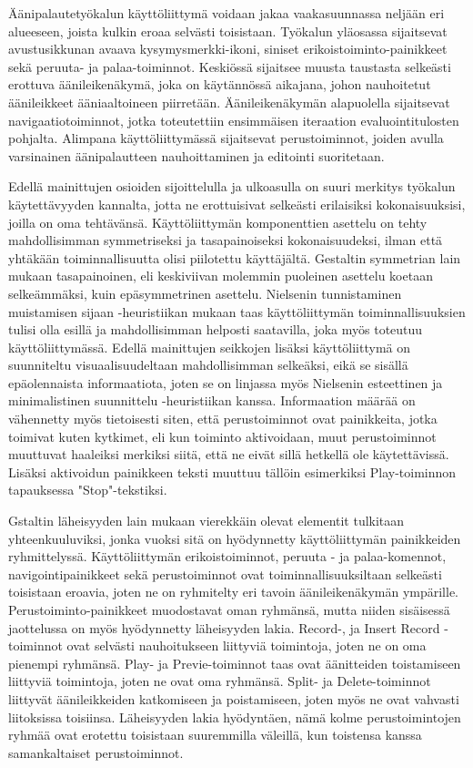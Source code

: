 \documentclass[utf8]{gradu3}
\begin{document}
Äänipalautetyökalun käyttöliittymä voidaan jakaa vaakasuunnassa neljään eri alueeseen, joista kulkin eroaa selvästi toisistaan. Työkalun yläosassa sijaitsevat avustusikkunan avaava kysymysmerkki-ikoni, siniset erikoistoiminto-painikkeet sekä peruuta- ja palaa-toiminnot. Keskiössä sijaitsee muusta taustasta selkeästi erottuva äänileikenäkymä, joka on käytännössä aikajana, johon nauhoitetut äänileikkeet ääniaaltoineen piirretään. Äänileikenäkymän alapuolella sijaitsevat navigaatiotoiminnot, jotka toteutettiin ensimmäisen iteraation evaluointitulosten pohjalta. Alimpana käyttöliittymässä sijaitsevat perustoiminnot, joiden avulla varsinainen äänipalautteen nauhoittaminen ja editointi suoritetaan. 

Edellä mainittujen osioiden sijoittelulla ja ulkoasulla on suuri merkitys työkalun käytettävyyden kannalta, jotta ne erottuisivat selkeästi erilaisiksi kokonaisuuksisi, joilla on oma tehtävänsä. Käyttöliittymän komponenttien asettelu on tehty mahdollisimman symmetriseksi ja tasapainoiseksi kokonaisuudeksi, ilman että yhtäkään toiminnallisuutta olisi piilotettu käyttäjältä. Gestaltin symmetrian lain mukaan tasapainoinen, eli keskiviivan molemmin puoleinen asettelu koetaan selkeämmäksi, kuin epäsymmetrinen asettelu. Nielsenin tunnistaminen muistamisen sijaan -heuristiikan mukaan taas käyttöliittymän toiminnallisuuksien tulisi olla esillä ja mahdollisimman helposti saatavilla, joka myös toteutuu käyttöliittymässä. Edellä mainittujen seikkojen lisäksi käyttöliittymä on suunniteltu visuaalisuudeltaan mahdollisimman selkeäksi, eikä se sisällä epäolennaista informaatiota, joten se on linjassa myös Nielsenin esteettinen ja minimalistinen suunnittelu -heuristiikan kanssa. Informaation määrää on vähennetty myös tietoisesti siten, että perustoiminnot ovat painikkeita, jotka toimivat kuten kytkimet, eli kun toiminto aktivoidaan, muut perustoiminnot muuttuvat haaleiksi merkiksi siitä, että ne eivät sillä hetkellä ole käytettävissä. Lisäksi aktivoidun painikkeen teksti muuttuu tällöin esimerkiksi Play-toiminnon tapauksessa "Stop"-tekstiksi.

Gstaltin läheisyyden lain mukaan vierekkäin olevat elementit tulkitaan yhteenkuuluviksi, jonka vuoksi sitä on hyödynnetty käyttöliittymän painikkeiden ryhmittelyssä. Käyttöliittymän erikoistoiminnot, peruuta - ja palaa-komennot, navigointipainikkeet sekä perustoiminnot ovat toiminnallisuuksiltaan selkeästi toisistaan eroavia, joten ne on ryhmitelty eri tavoin äänileikenäkymän ympärille. Perustoiminto-painikkeet muodostavat oman ryhmänsä, mutta niiden sisäisessä jaottelussa on myös hyödynnetty läheisyyden lakia. Record-, ja Insert Record -toiminnot ovat selvästi nauhoitukseen liittyviä toimintoja, joten ne on oma pienempi ryhmänsä. Play- ja Previe-toiminnot taas ovat äänitteiden toistamiseen liittyviä toimintoja, joten ne ovat oma ryhmänsä. Split- ja Delete-toiminnot liittyvät äänileikkeiden katkomiseen ja poistamiseen, joten myös ne ovat vahvasti liitoksissa toisiinsa. Läheisyyden lakia hyödyntäen, nämä kolme perustoimintojen ryhmää ovat erotettu toisistaan suuremmilla väleillä, kun toistensa kanssa samankaltaiset perustoiminnot. 
\end{document}
